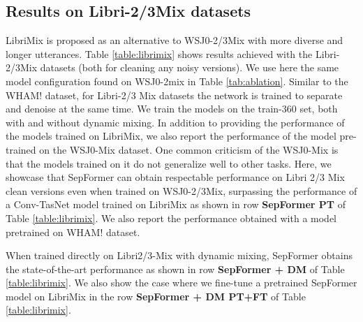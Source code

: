 \documentclass[lettersize,journal]{IEEEtran}
\begin{document}
\begin{table}[t]
\small
 \caption{Best results on the WHAMR dataset.}
 \vspace{0.1cm}
 \label{table:whamr}
 \centering
\end{table}

\subsection{Results on Libri-2/3Mix datasets}

LibriMix \cite{cosentino2020librimix} is proposed as an alternative to WSJ0-2/3Mix with more diverse and longer utterances.
Table \ref{table:librimix} shows results achieved with the Libri-2/3Mix datasets (both for cleaning any noisy versions). We use here the same model configuration found on WSJ0-2mix in Table \ref{tab:ablation}. Similar to the WHAM! dataset, for Libri-2/3 Mix datasets the network is trained to separate and denoise at the same time. We train the models on the train-360 set, both with and without dynamic mixing. In addition to providing the performance of the models trained on LibriMix, we also report the performance of the model pre-trained on the WSJ0-Mix dataset. One common criticism of the WSJ0-Mix is that the models trained on it do not generalize well to other tasks. Here, we showcase that SepFormer can obtain respectable performance on Libri 2/3 Mix clean versions even when trained on WSJ0-2/3Mix, surpassing the performance of a Conv-TasNet model trained on LibriMix as shown in row \textbf{SepFormer PT} of Table \ref{table:librimix}. We also report the performance obtained with a model pretrained on WHAM! dataset. 

When trained directly on Libri2/3-Mix with dynamic mixing, SepFormer obtains the state-of-the-art performance as shown in row \textbf{SepFormer + DM} of Table \ref{table:librimix}. We also show the case where we fine-tune a pretrained SepFormer model on LibriMix in the row \textbf{SepFormer + DM PT+FT} of Table \ref{table:librimix}. 
\end{document}
